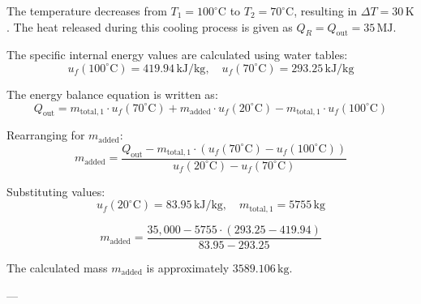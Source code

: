 The temperature decreases from \( T_1 = 100^\circ\text{C} \) to \( T_2 = 70^\circ\text{C} \), resulting in \( \Delta T = 30 \, \text{K} \). The heat released during this cooling process is given as \( Q_R = Q_{\text{out}} = 35 \, \text{MJ} \).  

The specific internal energy values are calculated using water tables:  
\[
u_f(100^\circ\text{C}) = 419.94 \, \text{kJ/kg}, \quad u_f(70^\circ\text{C}) = 293.25 \, \text{kJ/kg}
\]  

The energy balance equation is written as:  
\[
Q_{\text{out}} = m_{\text{total},1} \cdot u_f(70^\circ\text{C}) + m_{\text{added}} \cdot u_f(20^\circ\text{C}) - m_{\text{total},1} \cdot u_f(100^\circ\text{C})
\]  

Rearranging for \( m_{\text{added}} \):  
\[
m_{\text{added}} = \frac{Q_{\text{out}} - m_{\text{total},1} \cdot (u_f(70^\circ\text{C}) - u_f(100^\circ\text{C}))}{u_f(20^\circ\text{C}) - u_f(70^\circ\text{C})}
\]  

Substituting values:  
\[
u_f(20^\circ\text{C}) = 83.95 \, \text{kJ/kg}, \quad m_{\text{total},1} = 5755 \, \text{kg}
\]  

\[
m_{\text{added}} = \frac{35,000 - 5755 \cdot (293.25 - 419.94)}{83.95 - 293.25}
\]  

The calculated mass \( m_{\text{added}} \) is approximately \( 3589.106 \, \text{kg} \).  

---